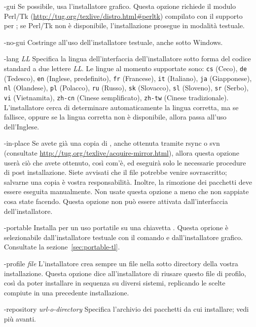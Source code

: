 \documentclass{article}
\begin{document}
\begin{ttdescription}
\item[-gui] Se possibile, usa l'installatore grafico. Questa opzione
  richiede il modulo Perl/Tk
  (\url{http://tug.org/texlive/distro.html#perltk}) compilato con il
  supporto per ; se Perl/Tk non è disponibile, l'installazione
  prosegue in modalità testuale.

\item[-no-gui] Costringe all'uso dell'installatore testuale, anche sotto
  Windows.

\item[-lang {\sl LL}] Specifica la lingua dell'interfaccia
  dell'installatore sotto forma del codice standard a due lettere
  \textsl{LL}. Le lingue al momento supportate sono:
  \texttt{cs} (Ceco),
  \texttt{de} (Tedesco),
  \texttt{en} (Inglese, predefinito),
  \texttt{fr} (Francese),
  \texttt{it} (Italiano),
  \texttt{ja} (Giapponese),
  \texttt{nl} (Olandese),
  \texttt{pl} (Polacco),
  \texttt{ru} (Russo),
  \texttt{sk} (Slovacco),
  \texttt{sl} (Sloveno),
  \texttt{sr} (Serbo),
  \texttt{vi} (Vietnamita),
  \texttt{zh-cn} (Cinese semplificato),
  \texttt{zh-tw} (Cinese tradizionale).
  L'installatore cerca di determinare automaticamente la lingua corretta,
  ma se fallisce, oppure se la lingua corretta non è disponibile, allora
  passa all'uso dell'Inglese.

\item[-in-place] Se avete già una copia di \TL{}, anche ottenuta tramite
  rsync o svn (consultate \url{http://tug.org/texlive/acquire-mirror.html}),
  allora questa opzione userà ciò che avete ottenuto, così com'è, ed
  eseguirà solo le necessarie procedure di post installazione. Siete
  avvisati che il file  potrebbe venire
  sovrascritto; salvarne una copia è vostra responsabilità. Inoltre, la
  rimozione dei pacchetti deve essere eseguita manualmente. Non usate questa
  opzione a meno che non sappiate cosa state facendo. Questa opzione non può
  essere attivata dall'interfaccia dell'installatore.

\item[-portable] Installa per un uso portatile su una chiavetta \USB{}.
  Questa oprione è selezionabile dall'installatore testuale con il comando
   e dall'installatore grafico. Consultate la
  sezione~\ref{sec:portable-tl}.

\item[-profile {\sl file}] L'installatore crea sempre un file
   nella sotto directory  della
  vostra installazione. Questa opzione dice all'installatore di riusare
  questo file di profilo, così da poter installare in sequenza su diversi
  sistemi, replicando le scelte compiute in una precedente installazione.

\item [-repository {\sl url-o-directory}] Specifica l'archivio dei
  pacchetti da cui installare; vedi più avanti.
\end{ttdescription}
\end{document}
